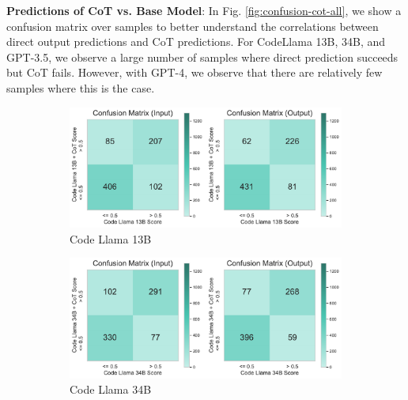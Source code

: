 \documentclass{article}
\begin{document}
\textbf{Predictions of CoT vs. Base Model}: In Fig. \ref{fig:confusion-cot-all}, we show a confusion matrix over samples to better understand the correlations between direct output predictions and CoT predictions. For CodeLlama 13B, 34B, and GPT-3.5, we observe a large number of samples where direct prediction succeeds but CoT fails. However, with GPT-4, we observe that there are relatively few samples where this is the case.

\begin{figure}[H]
     \centering
     \begin{subfigure}[t]{0.49\textwidth}
         \centering
         \includegraphics[width=\textwidth]{figs/confusion_cot/confusion_codellama_13B_codellama_cot13B.pdf}
         \caption{Code Llama 13B}
         \label{fig:confusion-cot-codellama-13b}
     \end{subfigure}%
     \hfill
     \begin{subfigure}[t]{0.49\textwidth}
         \centering
         \includegraphics[width=\textwidth]{figs/confusion_cot/confusion_codellama_30B_codellama_cot30B.pdf}
         \caption{Code Llama 34B}
         \label{fig:confusion-cot-codellama-34b}
     \end{subfigure}
     \newline
     \newline
     \newline
     \begin{subfigure}[t]{0.49\textwidth}

\end{subfigure}
\end{figure}
\end{document}
